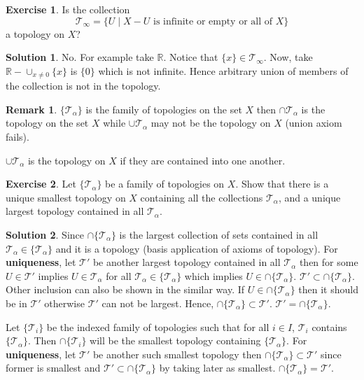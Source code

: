 \documentclass[12pt,reqno]{amsart}
\theoremstyle{plain}
\theoremstyle{definition}
\newtheorem{exer}{Exercise}
\newtheorem{rem}{Remark}
\newtheorem*{sol*}{Solution}
\newcommand{\bb}[1]{\mathbb{#1}}
\newcommand{\cal}[1]{\mathcal{#1}}
\begin{document}
\begin{exer}
    Is the collection $$ \cal T_{\infty} = \{U \mid X - U \text{ is infinite or empty or all of } X\}$$ a topology on $X$?
\end{exer}
\begin{sol*}
    No. For example take $\bb R$. Notice that $\{x\} \in \cal T_{\infty}$. Now, take $\bb R - \cup_{x \neq 0}\{x\}$ is $\{0\}$ which is not infinite. Hence arbitrary union of members of the collection is not in the topology.
\end{sol*}
\begin{rem}
    $\{\cal T_{\alpha}\}$ is the family of topologies on the set $X$ then $\cap \cal T_{\alpha}$ is the topology on the set $X$ while $\cup \cal T_{\alpha}$ may not be the topology on $X$ (union axiom fails). 
    \par $\cup \cal T_{\alpha}$ is the topology on $X$ if they are contained into one another.
\end{rem}
\begin{exer}
    Let $\{\cal T_{\alpha}\}$ be a family of topologies on $X$. Show that there is a unique smallest topology on $X$ containing all the collections $\cal T_{\alpha}$, and a unique largest topology contained in all $\cal T_\alpha$.
\end{exer}
\begin{sol*}
    Since $\cap\{\cal T_\alpha\}$ is the largest collection of sets contained in all $\cal T_\alpha \in \{\cal T_\alpha\}$ and it is a topology (basis application of axioms of topology). For {\bf uniqueness}, let $\cal T'$ be another largest topology contained in all $\cal T_\alpha$ then for some $U \in \cal T'$ implies $U \in \cal T_\alpha$ for all $\cal T_\alpha \in \{\cal T_\alpha\}$ which implies $U \in \cap \{\cal T_\alpha\}$. $\cal T' \subset \cap \{\cal T_\alpha\}$. Other inclusion can also be shown in the similar way. If $U \in \cap\{\cal T_\alpha\}$ then it should be in $\cal T'$ otherwise $\cal T'$ can not be largest. Hence, $\cap\{\cal T_\alpha\} \subset \cal T'$. $\cal T' = \cap\{\cal T_\alpha\}$.
    \par Let $\{\cal T_i\}$ be the indexed family of topologies such that for all $i \in I$, $\cal T_i$ contains $\{\cal T_\alpha\}$. Then $\cap \{\cal T_i\}$ will be the smallest topology containing $\{\cal T_\alpha\}$. For {\bf uniqueness}, let $\cal T'$ be another such smallest topology then $\cap \{\cal T_\alpha\} \subset \cal T'$ since former is smallest and $\cal T' \subset \cap \{\cal T_\alpha\}$ by taking later as smallest. $\cap \{\cal T_\alpha\} = \cal T'$.
\end{sol*}
\end{document}
